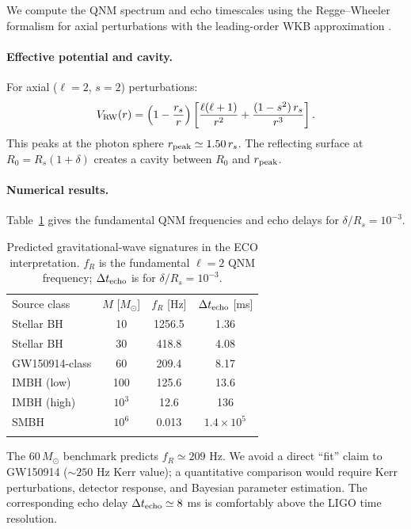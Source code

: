 \documentclass[epj]{svjour}
\begin{document}
We compute the QNM spectrum and echo timescales using the Regge--Wheeler formalism for axial perturbations with the leading-order WKB approximation \cite{SchutzWill1985}.

\paragraph{Effective potential and cavity.}
For axial ($\ell=2$, $s=2$) perturbations:
\begin{equation}
V_{\rm RW}(r) = \left(1 - \frac{r_s}{r}\right)
\left[\frac{\ell(\ell+1)}{r^2} + \frac{(1-s^2)\,r_s}{r^3}\right].
\label{eq:RW_potential}
\end{equation}
This peaks at the photon sphere $r_{\rm peak} \simeq 1.50\,r_s$. The reflecting surface at $R_0 = R_s(1+\delta)$ creates a cavity between $R_0$ and $r_{\rm peak}$.

\paragraph{Numerical results.}
Table~\ref{tab:qnm} gives the fundamental QNM frequencies and echo delays for $\delta/R_s = 10^{-3}$.

\begin{table}
\caption{Predicted gravitational-wave signatures in the ECO interpretation. $f_R$ is the fundamental $\ell=2$ QNM frequency; $\Delta t_{\rm echo}$ is for $\delta/R_s = 10^{-3}$.}
\label{tab:qnm}
\begin{tabular}{lccc}
\hline\noalign{\smallskip}
Source class & $M$ [$M_\odot$] & $f_R$ [Hz] & $\Delta t_{\rm echo}$ [ms] \\
\noalign{\smallskip}\hline\noalign{\smallskip}
Stellar BH        & 10      & 1256.5   & 1.36   \\
Stellar BH        & 30      & 418.8    & 4.08   \\
GW150914-class    & 60      & 209.4    & 8.17   \\
IMBH (low)        & 100     & 125.6    & 13.6   \\
IMBH (high)       & $10^3$  & 12.6     & 136    \\
SMBH              & $10^6$  & 0.013    & $1.4\times 10^5$ \\
\noalign{\smallskip}\hline
\end{tabular}
\end{table}

The 60\,$M_\odot$ benchmark predicts $f_R \simeq 209$ Hz. We avoid a direct ``fit'' claim to GW150914 ($\sim 250$ Hz Kerr value); a quantitative comparison would require Kerr perturbations, detector response, and Bayesian parameter estimation. The corresponding echo delay $\Delta t_{\rm echo} \simeq 8$ ms is comfortably above the LIGO time resolution.
\end{document}
